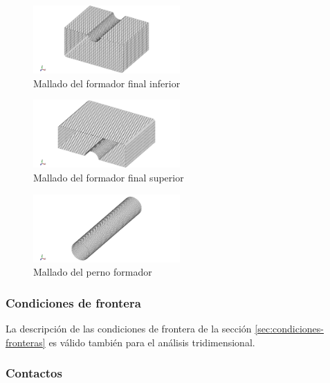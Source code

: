 \begin{figure}[H]
\centering
\includegraphics[width=0.5\textwidth]{src/ch3/mesh_ffi.png}
\caption{Mallado del formador final inferior}
\label{fig:mesh_ffi}
\end{figure}

\begin{figure}[H]
\centering
\includegraphics[width=0.5\textwidth]{src/ch3/mesh_ffs.png}
\caption{Mallado del formador final superior}
\label{fig:mesh_ffs}
\end{figure}

\begin{figure}[H]
\centering
\includegraphics[width=0.5\textwidth]{src/ch3/mesh_perno.png}
\caption{Mallado del perno formador}
\label{fig:mesh_perno}
\end{figure}


\subsubsection{Condiciones de frontera}

La descripción de las condiciones de frontera de la sección \ref{sec:condiciones-fronteras} es 
válido también para el análisis tridimensional.

\subsubsection{Contactos}

